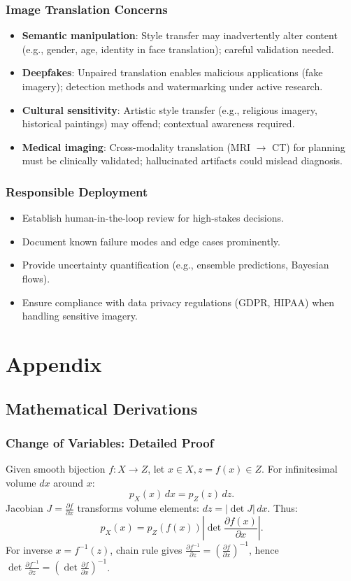 \documentclass[conference]{IEEEtran}
\begin{document}
\subsubsection{Image Translation Concerns}
\begin{itemize}
\item \textbf{Semantic manipulation}: Style transfer may inadvertently alter content (e.g., gender, age, identity in face translation); careful validation needed.
\item \textbf{Deepfakes}: Unpaired translation enables malicious applications (fake imagery); detection methods and watermarking under active research.
\item \textbf{Cultural sensitivity}: Artistic style transfer (e.g., religious imagery, historical paintings) may offend; contextual awareness required.
\item \textbf{Medical imaging}: Cross-modality translation (MRI $\to$ CT) for planning must be clinically validated; hallucinated artifacts could mislead diagnosis.
\end{itemize}

\subsubsection{Responsible Deployment}
\begin{itemize}
\item Establish human-in-the-loop review for high-stakes decisions.
\item Document known failure modes and edge cases prominently.
\item Provide uncertainty quantification (e.g., ensemble predictions, Bayesian flows).
\item Ensure compliance with data privacy regulations (GDPR, HIPAA) when handling sensitive imagery.
\end{itemize}

\section{Appendix}
\subsection{Mathematical Derivations}
\subsubsection{Change of Variables: Detailed Proof}
Given smooth bijection $f: X \to Z$, let $x \in X, z = f(x) \in Z$. For infinitesimal volume $dx$ around $x$:
\begin{equation}
p_X(x) \, dx = p_Z(z) \, dz.
\end{equation}
Jacobian $J = \frac{\partial f}{\partial x}$ transforms volume elements: $dz = |\det J| \, dx$. Thus:
\begin{equation}
p_X(x) = p_Z(f(x)) \left| \det \frac{\partial f(x)}{\partial x} \right|.
\end{equation}
For inverse $x = f^{-1}(z)$, chain rule gives $\frac{\partial f^{-1}}{\partial z} = \left(\frac{\partial f}{\partial x}\right)^{-1}$, hence $\det \frac{\partial f^{-1}}{\partial z} = \left(\det \frac{\partial f}{\partial x}\right)^{-1}$.
\end{document}
